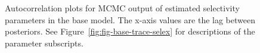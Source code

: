 \documentclass[11pt]{book}
\begin{document}
\begin{figure}[H]

{\centering {} 

}

\caption{Autocorrelation plots for MCMC output of estimated selectivity parameters in the base model. The x-axis values are the lag between posteriors. See Figure~\ref{fig:fig-base-trace-selex} for descriptions of the parameter subscripts.}\label{fig:fig-base-autocor-selex}
\end{figure}
\end{document}
